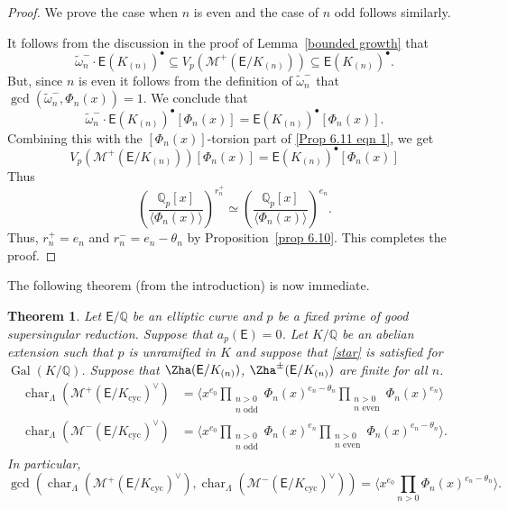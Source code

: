 \documentclass{amsart}
\newtheorem{theorem}{Theorem}[section]
\numberwithin{equation}{section}
\theoremstyle{remark}
\newcommand{\EC}{\mathsf{E}}
\newcommand{\cM}{\mathcal{M}}
\newcommand{\Gal}{\operatorname{Gal}}
\newcommand{\Qp}{\mathbb{Q}_p}
\newcommand{\Q}{\mathbb{Q}}
\newcommand{\cyc}{\operatorname{{cyc}}}
\newcommand{\charac}{\operatorname{char}}
\theoremstyle{plain} %
\begin{document}
\begin{proof}
We prove the case when $n$ is even and the case of $n$ odd follows similarly.

It follows from the discussion in the proof of Lemma~\ref{bounded growth} that
\begin{equation}
\label{Prop 6.11 eqn 1}
\tilde{\omega}_n^{-} \cdot \EC(K_{(n)})^{\bullet} \subseteq V_p(\cM^{+}(\EC/K_{(n)})) \subseteq \EC(K_{(n)})^{\bullet}.
\end{equation}
But, since $n$ is even it follows from the definition of $\tilde{\omega}_n^-$ that $\gcd(\tilde{\omega}_n^-, \Phi_n(x))=1$.
We conclude that
\[
\tilde{\omega}_n^{-} \cdot \EC(K_{(n)})^{\bullet}[\Phi_n(x)] = \EC(K_{(n)})^{\bullet}[\Phi_n(x)].
\]
Combining this with the $[\Phi_n(x)]$-torsion part of \eqref{Prop 6.11 eqn 1}, we get
\[
V_p(\cM^{+}(\EC/K_{(n)}))[\Phi_n(x)] = \EC(K_{(n)})^{\bullet}[\Phi_n(x)]
\]
Thus
\[
\left( \frac{\Qp[x]}{\langle \Phi_n(x) \rangle}\right)^{r_n^+} \simeq \left( \frac{\Qp[x]}{\langle \Phi_n(x) \rangle}\right)^{e_n}.
\]
Thus, $r_n^+ = e_n$ and $r_n^- = e_n - \theta_n$ by Proposition~\ref{prop 6.10}.
This completes the proof.
\end{proof}



The following theorem (from the introduction) is now immediate.

\begin{theorem}
\label{thm 6.13}
Let $\EC/\Q$ be an elliptic curve and $p$ be a fixed prime of good \emph{supersingular} reduction.
Suppose that $a_p(\EC)=0$.
Let $K/\Q$ be an abelian extension such that $p$ is unramified in $K$ and suppose that \ref{star} is satisfied for $\Gal(K/\Q)$.
Suppose that $\Zha(\EC/K_{(n)})$, $\Zha^{\pm}(\EC/K_{(n)})$ are finite for all $n$.
\begin{align*}
    \charac_{\Lambda}(\cM^{+}(\EC/K_{\cyc})^\vee) & = \Bigg\langle x^{e_0} \prod_{\substack{n>0\\ n \text{ odd}}} \Phi_n(x)^{e_n - \theta_n} \prod_{\substack{n>0\\ n \text{ even}}} \Phi_n(x)^{e_n} \Bigg\rangle\\
     \charac_{\Lambda}(\cM^{-}(\EC/K_{\cyc})^\vee) & = \Bigg \langle x^{e_0} \prod_{\substack{n>0\\ n \text{ odd}}} \Phi_n(x)^{e_n} \prod_{\substack{n>0\\ n \text{ even}}} \Phi_n(x)^{e_n  - \theta_n} \Bigg\rangle.
\end{align*}
In particular,
\[
\gcd\left( \charac_{\Lambda}(\cM^{+}(\EC/K_{\cyc})^\vee), \charac_{\Lambda}(\cM^{-}(\EC/K_{\cyc})^\vee)\right) = \Bigg\langle x^{e_0} \prod_{n>0} \Phi_n(x)^{e_n - \theta_n} \Bigg\rangle.
\]
\end{theorem}
\end{document}

